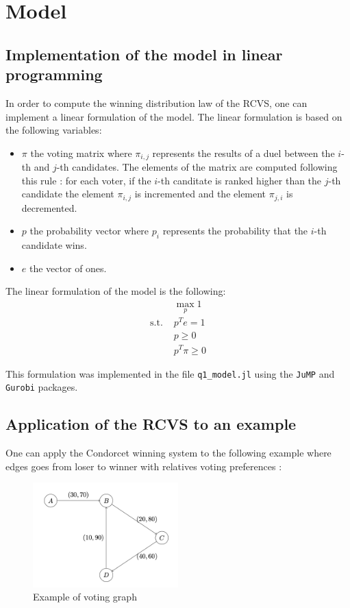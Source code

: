 \section{Model}

\subsection{Implementation of the model in linear programming}
\label{sec:model}
In order to compute the winning distribution law of the RCVS, one can implement a linear formulation of the model.
The linear formulation is based on the following variables:
\begin{itemize}
  \item $\pi$ the voting matrix where $\pi_{i,j}$ represents the results of a duel between the $i$-th and $j$-th candidates.
  The elements of the matrix are computed following this rule : for each voter, if the $i$-th canditate is ranked higher than the $j$-th candidate the element $\pi_{i,j}$ is incremented
  and the element $\pi_{j,i}$ is decremented.
  \item $p$ the probability vector where $p_i$ represents the probability that the $i$-th candidate wins.
  \item $e$ the vector of ones.
\end{itemize}

The linear formulation of the model is the following:
\begin{align*}
  &\max_{p} 1\\
  \text{s.t. } &p^T e = 1\\
  &p \geq 0\\
  &p^T \pi \geq 0  
\end{align*}

This formulation was implemented in the file \verb|q1_model.jl| using the \verb|JuMP| and \verb|Gurobi| packages.

\subsection{Application of the RCVS to an example}
One can apply the Condorcet winning system to the following example where edges goes from loser to winner with relatives voting preferences :

\begin{figure}[!h]
  \centering
  \includegraphics[width=0.5\textwidth]{figs/graph.png}
  \caption{Example of voting graph}
  \label{fig:q1_example}
\end{figure}

